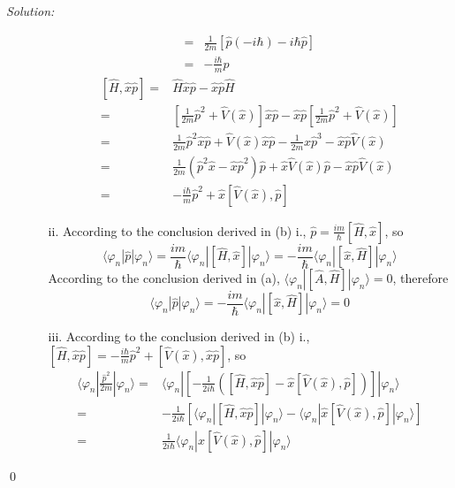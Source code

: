 \documentclass[12pt,a4paper]{article}
\newenvironment{sol}
    {\emph{Solution:}
    }
    {
    \qed
    }
\begin{document}
\begin{sol}
\begin{itemize}
\begin{itemize}
\begin{align}
\nonumber=&\frac{1}{2m}[\hat{p}(-i\hbar)-i\hbar\hat{p}]\\
=&-\frac{i\hbar}{m}\hat{p}
\end{align}
\begin{align}
\nonumber[\hat{H},\hat{x}\hat{p}]=&\hat{H}\hat{x}\hat{p}-\hat{x}\hat{p}\hat{H}\\
\nonumber=&\left[\frac{1}{2m}\hat{p}^2+\hat{V}(\hat{x})\right]\hat{x}\hat{p}-\hat{x}\hat{p}\left[\frac{1}{2m}\hat{p}^2+\hat{V}(\hat{x})\right]\\
\nonumber=&\frac{1}{2m}\hat{p}^2\hat{x}\hat{p}+\hat{V}(\hat{x})\hat{x}\hat{p}-\frac{1}{2m}\hat{x}\hat{p}^3-\hat{x}\hat{p}\hat{V}(\hat{x})\\
\nonumber=&\frac{1}{2m}(\hat{p}^2\hat{x}-\hat{x}\hat{p}^2)\hat{p}+\hat{x}\hat{V}(\hat{x})\hat{p}-\hat{x}\hat{p}\hat{V}(\hat{x})\\
=&-\frac{i\hbar}{m}\hat{p}^2+\hat{x}[\hat{V}(\hat{x}),\hat{p}]
\end{align}
\item[ii.] According to the conclusion derived in (b) i., $\hat{p}=\frac{im}{\hbar}[\hat{H},\hat{x}]$, so
\begin{equation}
\langle\varphi_n|\hat{p}|\varphi_n\rangle=\frac{im}{\hbar}\langle\varphi_n|[\hat{H},\hat{x}]|\varphi_n\rangle=-\frac{im}{\hbar}\langle\varphi_n|[\hat{x},\hat{H}]|\varphi_n\rangle
\end{equation}
According to the conclusion derived in (a), $\langle\varphi_n|[\hat{A},\hat{H}]|\varphi_n\rangle=0$, therefore
\begin{equation}
\langle\varphi_n|\hat{p}|\varphi_n\rangle=-\frac{im}{\hbar}\langle\varphi_n|[\hat{x},\hat{H}]|\varphi_n\rangle=0
\end{equation}
\item[iii.] According to the conclusion derived in (b) i., $[\hat{H},\hat{x}\hat{p}]=-\frac{i\hbar}{m}\hat{p}^2+[\hat{V}(\hat{x}),\hat{x}\hat{p}]$, so
\begin{align}
\nonumber\langle\varphi_n|\frac{\hat{p}^2}{2m}|\varphi_n\rangle=&\langle\varphi_n|\left[-\frac{1}{2i\hbar}([\hat{H},\hat{x}\hat{p}]-\hat{x}[\hat{V}(\hat{x}),\hat{p}])\right]|\varphi_n\rangle\\
\nonumber=&-\frac{1}{2i\hbar}\left[\langle\varphi_n|[\hat{H},\hat{x}\hat{p}]|\varphi_n\rangle-\langle\varphi_n|\hat{x}[\hat{V}(\hat{x}),\hat{p}]|\varphi_n\rangle\right]\\
=&\frac{1}{2i\hbar}\langle\varphi_n|\hat{x}[\hat{V}(\hat{x}),\hat{p}]|\varphi_n\rangle
\end{align}

\end{itemize}
\end{itemize}
\end{sol}
\end{document}
